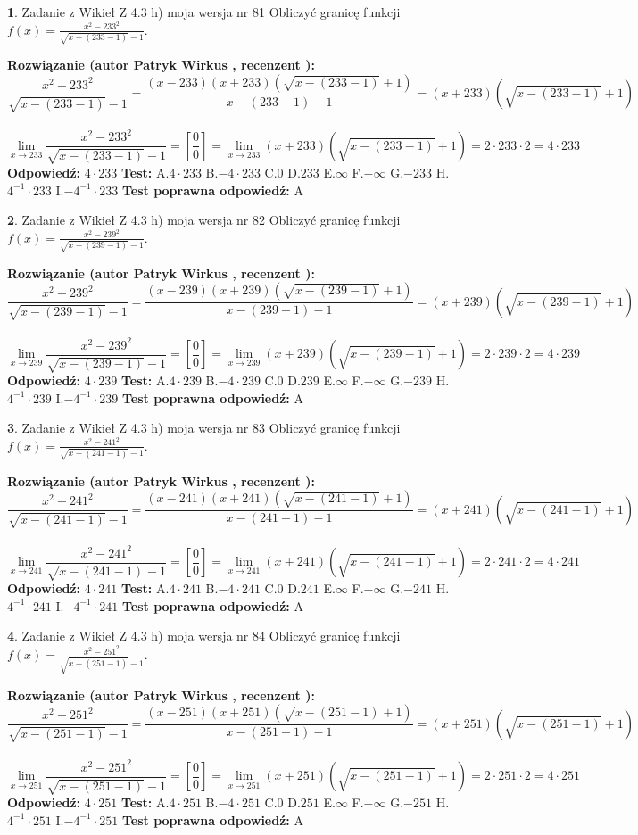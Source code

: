 \documentclass[12pt, a4paper]{article}
\theoremstyle{definition} %
\newtheorem{zad}{}
\newcommand{\zadStart}[1]{\begin{zad}#1\newline}
\newcommand{\zadStop}{\end{zad}}
\newcommand{\rozwStart}[2]{\noindent \textbf{Rozwiązanie (autor #1 , recenzent #2): }\newline}
\newcommand{\rozwStop}{\newline}
\newcommand{\odpStart}{\noindent \textbf{Odpowiedź:}\newline}
\newcommand{\odpStop}{\newline}
\newcommand{\testStart}{\noindent \textbf{Test:}\newline}
\newcommand{\testStop}{\newline}
\newcommand{\kluczStart}{\noindent \textbf{Test poprawna odpowiedź:}\newline}
\newcommand{\kluczStop}{\newline}
\begin{document}
\zadStart{Zadanie z Wikieł Z 4.3 h) moja wersja nr 81}
Obliczyć granicę funkcji $f(x)=\frac{x^{2} - 233^{2}}{\sqrt{x-(233-1)}-1}$.
\zadStop
\rozwStart{Patryk Wirkus}{}
$$\frac{x^{2} - 233^{2}}{\sqrt{x-(233-1)}-1}=\frac{(x-233)(x+233)(\sqrt{x-(233-1)}+1)}{x-(233-1)-1}=(x+233)(\sqrt{x-(233-1)}+1)$$
\\
$$\lim\limits_{x\to 233}\frac{x^{2} - 233^{2}}{\sqrt{x-(233-1)}-1}=[\frac{0}{0}]=
\lim\limits_{x\to 233}(x+233)(\sqrt{x-(233-1)}+1) = 2\cdot233 \cdot 2 = 4 \cdot 233$$
\rozwStop
\odpStart
$4\cdot233$
\odpStop
\testStart
A.$4\cdot233$
B.$-4\cdot233$
C.$0$
D.$233$
E.$\infty$
F.$-\infty$
G.$-233$
H.$4^{-1}\cdot233$
I.$-4^{-1}\cdot233$
\testStop
\kluczStart
A
\kluczStop



\zadStart{Zadanie z Wikieł Z 4.3 h) moja wersja nr 82}
Obliczyć granicę funkcji $f(x)=\frac{x^{2} - 239^{2}}{\sqrt{x-(239-1)}-1}$.
\zadStop
\rozwStart{Patryk Wirkus}{}
$$\frac{x^{2} - 239^{2}}{\sqrt{x-(239-1)}-1}=\frac{(x-239)(x+239)(\sqrt{x-(239-1)}+1)}{x-(239-1)-1}=(x+239)(\sqrt{x-(239-1)}+1)$$
\\
$$\lim\limits_{x\to 239}\frac{x^{2} - 239^{2}}{\sqrt{x-(239-1)}-1}=[\frac{0}{0}]=
\lim\limits_{x\to 239}(x+239)(\sqrt{x-(239-1)}+1) = 2\cdot239 \cdot 2 = 4 \cdot 239$$
\rozwStop
\odpStart
$4\cdot239$
\odpStop
\testStart
A.$4\cdot239$
B.$-4\cdot239$
C.$0$
D.$239$
E.$\infty$
F.$-\infty$
G.$-239$
H.$4^{-1}\cdot239$
I.$-4^{-1}\cdot239$
\testStop
\kluczStart
A
\kluczStop



\zadStart{Zadanie z Wikieł Z 4.3 h) moja wersja nr 83}
Obliczyć granicę funkcji $f(x)=\frac{x^{2} - 241^{2}}{\sqrt{x-(241-1)}-1}$.
\zadStop
\rozwStart{Patryk Wirkus}{}
$$\frac{x^{2} - 241^{2}}{\sqrt{x-(241-1)}-1}=\frac{(x-241)(x+241)(\sqrt{x-(241-1)}+1)}{x-(241-1)-1}=(x+241)(\sqrt{x-(241-1)}+1)$$
\\
$$\lim\limits_{x\to 241}\frac{x^{2} - 241^{2}}{\sqrt{x-(241-1)}-1}=[\frac{0}{0}]=
\lim\limits_{x\to 241}(x+241)(\sqrt{x-(241-1)}+1) = 2\cdot241 \cdot 2 = 4 \cdot 241$$
\rozwStop
\odpStart
$4\cdot241$
\odpStop
\testStart
A.$4\cdot241$
B.$-4\cdot241$
C.$0$
D.$241$
E.$\infty$
F.$-\infty$
G.$-241$
H.$4^{-1}\cdot241$
I.$-4^{-1}\cdot241$
\testStop
\kluczStart
A
\kluczStop



\zadStart{Zadanie z Wikieł Z 4.3 h) moja wersja nr 84}
Obliczyć granicę funkcji $f(x)=\frac{x^{2} - 251^{2}}{\sqrt{x-(251-1)}-1}$.
\zadStop
\rozwStart{Patryk Wirkus}{}
$$\frac{x^{2} - 251^{2}}{\sqrt{x-(251-1)}-1}=\frac{(x-251)(x+251)(\sqrt{x-(251-1)}+1)}{x-(251-1)-1}=(x+251)(\sqrt{x-(251-1)}+1)$$
\\
$$\lim\limits_{x\to 251}\frac{x^{2} - 251^{2}}{\sqrt{x-(251-1)}-1}=[\frac{0}{0}]=
\lim\limits_{x\to 251}(x+251)(\sqrt{x-(251-1)}+1) = 2\cdot251 \cdot 2 = 4 \cdot 251$$
\rozwStop
\odpStart
$4\cdot251$
\odpStop
\testStart
A.$4\cdot251$
B.$-4\cdot251$
C.$0$
D.$251$
E.$\infty$
F.$-\infty$
G.$-251$
H.$4^{-1}\cdot251$
I.$-4^{-1}\cdot251$
\testStop
\kluczStart
A
\kluczStop
\end{document}
